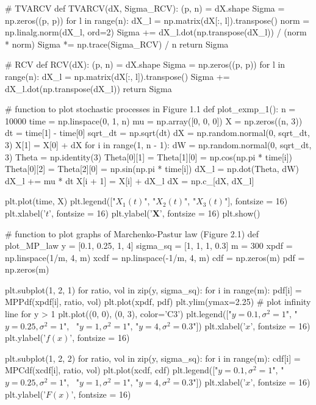 \documentclass[a4paper,11pt]{book}
\theoremstyle{plain}
\theoremstyle{definition}
\begin{document}
\begin{python}
# TVARCV
def TVARCV(dX, Sigma_RCV):
    (p, n) = dX.shape
    Sigma = np.zeros((p, p))
    for l in range(n):
        dX_l = np.matrix(dX[:, l]).transpose()
        norm = np.linalg.norm(dX_l, ord=2)
        Sigma += dX_l.dot(np.transpose(dX_l)) / (norm * norm)
    Sigma *= np.trace(Sigma_RCV) / n
    return Sigma


# RCV
def RCV(dX):
    (p, n) = dX.shape
    Sigma = np.zeros((p, p))
    for l in range(n):
        dX_l = np.matrix(dX[:, l]).transpose()
        Sigma += dX_l.dot(np.transpose(dX_l))
    return Sigma
  

# function to plot stochastic processes in Figure 1.1
def plot_exmp_1():
    n = 10000
    time = np.linspace(0, 1, n)
    mu = np.array([0, 0, 0])
    X = np.zeros((n, 3))
    dt = time[1] - time[0]
    sqrt_dt = np.sqrt(dt)
    dX = np.random.normal(0, sqrt_dt, 3)
    X[1] = X[0] + dX
    for i in range(1, n - 1):
        dW = np.random.normal(0, sqrt_dt, 3)
        Theta = np.identity(3)
        Theta[0][1] = Theta[1][0] = np.cos(np.pi * time[i])
        Theta[0][2] = Theta[2][0] = np.sin(np.pi * time[i])
        dX_l = np.dot(Theta, dW)
        dX_l += mu * dt
        X[i + 1] = X[i] + dX_l
        dX = np.c_[dX, dX_l]

    plt.plot(time, X)
    plt.legend(["$X_1(t)$", "$X_2(t)$", "$X_3(t)$"], fontsize = 16)
    plt.xlabel('$t$', fontsize = 16)
    plt.ylabel('$\mathbf{X}$', fontsize = 16)
    plt.show()


# function to plot graphs of Marchenko-Pastur law (Figure 2.1)
def plot_MP_law
    y = [0.1, 0.25, 1, 4]
    sigma_sq = [1, 1, 1, 0.3]
    m = 300
    xpdf = np.linspace(1/m, 4, m)
    xcdf = np.linspace(-1/m, 4, m)
    cdf = np.zeros(m)
    pdf = np.zeros(m)
	
    plt.subplot(1, 2, 1)
    for ratio, vol in zip(y, sigma_sq):
        for i in range(m):
    	    pdf[i] = MPPdf(xpdf[i], ratio, vol)
        plt.plot(xpdf, pdf)
    plt.ylim(ymax=2.25)
    # plot infinity line for y > 1
    plt.plot((0, 0), (0, 3), color='C3')
    plt.legend(["$y=0.1, \sigma^2=1$", "$y=0.25, \sigma^2=1$", \
        "$y=1, \sigma^2=1$", "$y=4, \sigma^2=0.3$"])
    plt.xlabel('$x$', fontsize = 16)
    plt.ylabel('$f(x)$', fontsize = 16)
	
    plt.subplot(1, 2, 2)
    for ratio, vol in zip(y, sigma_sq):
        for i in range(m):
            cdf[i] = MPCdf(xcdf[i], ratio, vol)
        plt.plot(xcdf, cdf)
    plt.legend(["$y=0.1, \sigma^2=1$", "$y=0.25, \sigma^2=1$", \
        "$y=1, \sigma^2=1$", "$y=4, \sigma^2=0.3$"]) 
    plt.xlabel('$x$', fontsize = 16)
    plt.ylabel('$F(x)$', fontsize = 16)
	

\end{python}
\end{document}
